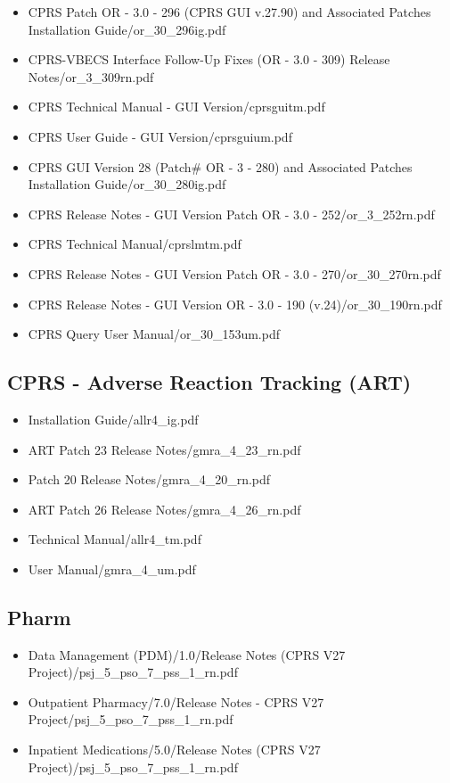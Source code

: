 \documentclass{OSEHRAArticle}
\begin{document}
\begin{itemize}
\item CPRS Patch OR - 3.0 - 296 (CPRS GUI v.27.90) and Associated Patches Installation Guide/or\_30\_296ig.pdf
\item CPRS-VBECS Interface Follow-Up Fixes (OR - 3.0 - 309) Release Notes/or\_3\_309rn.pdf
\item CPRS Technical Manual -  GUI Version/cprsguitm.pdf
\item CPRS User Guide -  GUI Version/cprsguium.pdf
\item CPRS GUI Version 28 (Patch# OR - 3 - 280) and Associated Patches Installation Guide/or\_30\_280ig.pdf
\item CPRS Release Notes -  GUI Version Patch OR - 3.0 - 252/or\_3\_252rn.pdf
\item CPRS Technical Manual/cprslmtm.pdf
\item CPRS Release Notes -  GUI Version Patch OR - 3.0 - 270/or\_30\_270rn.pdf
\item CPRS Release Notes -  GUI Version OR - 3.0 - 190 (v.24)/or\_30\_190rn.pdf
\item CPRS Query User Manual/or\_30\_153um.pdf
\end{itemize}


\subsection{ CPRS -  Adverse Reaction Tracking (ART) }

\begin{itemize}
\item Installation Guide/allr4\_ig.pdf
\item ART Patch 23 Release Notes/gmra\_4\_23\_rn.pdf
\item Patch 20 Release Notes/gmra\_4\_20\_rn.pdf
\item ART Patch 26 Release Notes/gmra\_4\_26\_rn.pdf
\item Technical Manual/allr4\_tm.pdf
\item User Manual/gmra\_4\_um.pdf
\end{itemize}


\subsection{Pharm}

\begin{itemize}
\item Data Management (PDM)/1.0/Release Notes (CPRS V27 Project)/psj\_5\_pso\_7\_pss\_1\_rn.pdf
\item Outpatient Pharmacy/7.0/Release Notes - CPRS V27 Project/psj\_5\_pso\_7\_pss\_1\_rn.pdf
\item Inpatient Medications/5.0/Release Notes (CPRS V27 Project)/psj\_5\_pso\_7\_pss\_1\_rn.pdf
\end{itemize}
\end{document}

